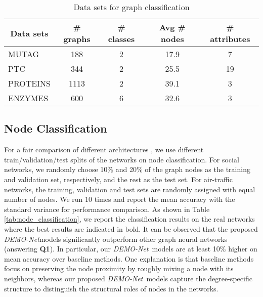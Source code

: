 \documentclass[sigconf]{acmart}
\newcommand{\demonet}{{\emph {DEMO-Net}}}
\begin{document}
\begin{table}
\caption{Data sets for graph classification}
\label{graph_datasets}
\small
\begin{tabular}{|l|c|c|c|c|}
\hline
\multicolumn{1}{|c|}{Data sets} & \# graphs & \# classes & Avg \# nodes & \# attributes \\ \hline
MUTAG                           & 188      & 2         & 17.9        & 7            \\ \hline
PTC                             & 344      & 2         & 25.5        & 19           \\ \hline
PROTEINS                        & 1113     & 2         & 39.1        & 3            \\ \hline
ENZYMES                         & 600      & 6         & 32.6        & 3            \\ \hline
\end{tabular}
\vspace{-3mm}

\end{table}

\subsection{Node Classification}
For a fair comparison of different architectures \cite{shchur2018pitfalls}, we use different train/validation/test splits of the networks on node classification.
For social networks, we randomly choose 10\% and 20\% of the graph nodes as the training and validation set, respectively, and the rest as the test set. For air-traffic networks, the training, validation and test sets are randomly assigned with equal number of nodes. We run 10 times and report the mean accuracy with the standard variance for performance comparison. As shown in Table \ref{tab:node_classification}, we report the classification results on the real networks where the best results are indicated in bold. It can be observed that the proposed \demonet models significantly outperform other graph neural networks (answering \textbf{Q1}). In particular, our \demonet\ models are at least 10\% higher on mean accuracy over baseline methods. One explanation is that baseline methods focus on preserving the node proximity by roughly mixing a node with its neighbors, whereas our proposed \demonet\ models capture the degree-specific structure to distinguish the structural roles of nodes in the networks.
\end{document}
